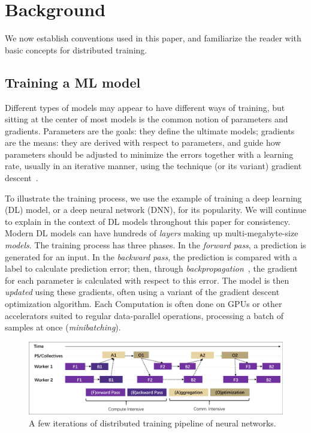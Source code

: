 \section{Background}
We now establish conventions used in this paper, and familiarize the reader with basic concepts for distributed training.


\subsection{Training a ML model}
Different types of models may appear to have different ways of training, but sitting at the center of most models is the common notion of parameters and gradients. Parameters are the goals: they define the ultimate models; gradients are the means: they are derived with respect to parameters, and guide how parameters should be adjusted to minimize the errors together with a learning rate, usually in an iterative manner, using the technique (or its variant) gradient descent~\cite{subgradient,DBLP:journals/corr/Ruder16}. 

To illustrate the training process, we use the example of training a deep learning (DL) model, or a deep neural network (DNN), for its popularity. We will continue to explain in the context of DL models throughout this paper for consistency. Modern DL models can have hundreds of \textit{layers} making up multi-megabyte-size \textit{models}. The training process has three phases. In the \textit{forward pass}, a prediction is generated for an input. In the \textit{backward pass}, the prediction is compared with a label to calculate prediction error; then, through \textit{backpropagation}~\cite{backprop}, the gradient for each parameter
is calculated with respect to this error. The model is then \textit{updated} using these gradients, often using a variant of the gradient descent optimization algorithm. Each Computation is often done on GPUs or other accelerators suited to regular data-parallel operations, processing a batch of samples at once (\textit{minibatching}).

\begin{figure}[t!]
	\centering
	\includegraphics[width=\linewidth, trim=2 3 3 3,clip]{Figures/distributedtraining.pdf}
	\caption{A few iterations of distributed training pipeline of neural networks.}
	\label{fig:distributedtraining}
\end{figure}

